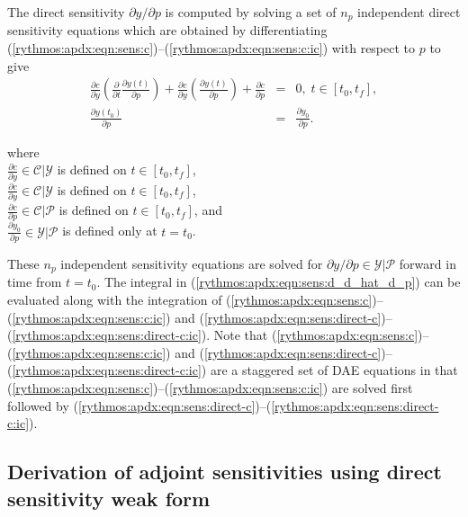\documentclass[pdf,ps2pdf,11pt]{SANDreport}
\begin{document}
The direct sensitivity $\partial y / {}\partial p$ is computed by solving a
set of $n_p$ independent direct sensitivity equations which are obtained by
differentiating
(\ref{rythmos:apdx:eqn:sens:c})--(\ref{rythmos:apdx:eqn:sens:c:ic}) with
respect to $p$ to give
%
\begin{eqnarray}
%
\frac{\partial c}{\partial \dot{y}} \left(\frac{\partial}{\partial t} \frac{\partial y(t)}{\partial p} \right)
+ \frac{\partial c}{\partial y} \left(\frac{\partial y(t)}{\partial p}\right)
+ \frac{\partial c}{\partial p} & = & 0, \; t \in \left[ t_0, t_f \right], \label{rythmos:apdx:eqn:sens:direct-c} \\
\frac{\partial y(t_0)}{\partial p} & = & \frac{\partial y_0}{\partial p}. \label{rythmos:apdx:eqn:sens:direct-c:ic}
\end{eqnarray}
\begin{tabbing}
\hspace{4ex}where\hspace{1ex}\= \\
\>	$\frac{\partial c}{\partial \dot{y}} \in \mathcal{C}|\mathcal{Y}$ is defined on $t\in[t_0,t_f]$, \\
\>	$\frac{\partial c}{\partial y} \in \mathcal{C}|\mathcal{Y}$ is defined on $t\in[t_0,t_f]$, \\
\>	$\frac{\partial c}{\partial p} \in \mathcal{C}|\mathcal{P}$ is defined on $t\in[t_0,t_f]$, and \\
\>	$\frac{\partial y_0}{\partial p} \in \mathcal{Y}|\mathcal{P}$ is defined only at $t=t_0$.
\end{tabbing}

These $n_p$ independent sensitivity equations are solved for ${}\partial y /
{}\partial p {}\in\mathcal{Y}|\mathcal{P}$ forward in time from $t=t_0$.  The
integral in (\ref{rythmos:apdx:eqn:sens:d_d_hat_d_p}) can be evaluated along
with the integration of
(\ref{rythmos:apdx:eqn:sens:c})--(\ref{rythmos:apdx:eqn:sens:c:ic}) and
(\ref{rythmos:apdx:eqn:sens:direct-c})--(\ref{rythmos:apdx:eqn:sens:direct-c:ic}).
Note that (\ref{rythmos:apdx:eqn:sens:c})--(\ref{rythmos:apdx:eqn:sens:c:ic})
and
(\ref{rythmos:apdx:eqn:sens:direct-c})--(\ref{rythmos:apdx:eqn:sens:direct-c:ic})
are a staggered set of DAE equations in that
(\ref{rythmos:apdx:eqn:sens:c})--(\ref{rythmos:apdx:eqn:sens:c:ic}) are solved
first followed by
(\ref{rythmos:apdx:eqn:sens:direct-c})--(\ref{rythmos:apdx:eqn:sens:direct-c:ic}).

\subsection{Derivation of adjoint sensitivities using direct sensitivity weak form}
\end{document}
